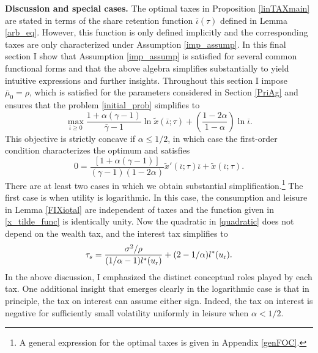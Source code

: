 \documentclass[11pt]{article}
\theoremstyle{plain}
\begin{document}
\textbf{Discussion and special cases.} The optimal taxes in Proposition \ref{linTAXmain} are stated in terms of the share retention function $\overline{\iota}(\tau)$ defined in Lemma \ref{arb_eq}. However, this function is only defined implicitly and the corresponding taxes are only characterized under Assumption \ref{imp_assump}. In this final section I show that Assumption \ref{imp_assump} is satisfied for several common functional forms and that the above algebra simplifies substantially to yield intuitive expressions and further insights. Throughout this section I impose $\overline{\mu}_0 = \rho$, which is satisfied for the parameters considered in Section \ref{PriAg} and ensures that the problem \eqref{initial_prob} simplifies to 
\begin{equation} %
\max_{\overline{\iota} \geq 0} \frac{1 + \alpha(\gamma-1)}{\overline{\gamma}-1}\ln \tilde{x}(\overline{\iota};\tau) + {\left(\frac{1 - 2\alpha}{1 - \alpha}\right)} \ln \overline{\iota}.
\label{initial_prob_simp}
\end{equation}
This objective is strictly concave if $\alpha \leq 1/2$, in which case the first-order condition characterizes the optimum and satisfies
\begin{equation}
0 = \frac{[1 + \alpha(\gamma-1)]}{(\gamma-1)(1 - 2\alpha)}\tilde{x}'(\overline{\iota};\tau)\overline{\iota} + \tilde{x}(\overline{\iota};\tau).
\label{quadratic}
\end{equation}
There are at least two cases in which we obtain substantial simplification.\footnote{A general expression for the optimal taxes is given in Appendix \ref{genFOC}.} The first case is when utility is logarithmic. In this case, the consumption and leisure in Lemma \ref{FIXiotal} are independent of taxes and the function given in \eqref{x_tilde_func} is identically unity. Now the quadratic in \eqref{quadratic} does not depend on the wealth tax, and the interest tax simplifies to 
\begin{equation}
\tau_s = \frac{\sigma^2/\rho}{(1/\alpha-1)l^*(u_{\textnormal{r}})} + (2 - 1/\alpha)l^*(u_{\textnormal{r}}).
\label{log_system}
\end{equation}
In the above discussion, I emphasized the distinct conceptual roles played by each tax. One additional insight that emerges clearly in the logarithmic case is that in principle, the tax on interest can assume either sign. Indeed, the tax on interest is negative for sufficiently small volatility uniformly in leisure when $\alpha < 1/2$. 
\end{document}
